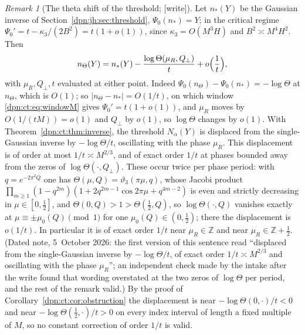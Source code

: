 \documentclass[11pt]{article}
\numberwithin{equation}{section}
\theoremstyle{definition}\newtheorem{definition}[theorem]{Definition}
\theoremstyle{remark}\newtheorem{remark}[theorem]{Remark}
\newcommand{\wrt}{\textup{[write]}}
\begin{document}
\begin{remark}[The theta shift of the threshold; \wrt]\label{dpn:ct:rem:shift}
Let $n_*(Y)$ be the Gaussian inverse of Section~\ref{dpn:jh:sec:threshold},
$\Psi_0(n_*)=Y$; in the critical regime $\Psi_0'=t-\kappa_3/(2B^2)=t(1+o(1))$,
since $\kappa_3=O(M^3H)$ and $B^2\asymp M^4H^2$.  Then
\begin{equation}\label{dpn:ct:eq:shift}
 n_\Theta(Y)=n_*(Y)-\frac{\log\Theta(\mu_R,Q_\perp)}{t}+o\Bigl(\frac1t\Bigr),
\end{equation}
with $\mu_R,Q_\perp,t$ evaluated at either point.  Indeed
$\Psi_0(n_\Theta)-\Psi_0(n_*)=-\log\Theta$ at $n_\Theta$, which is $O(1)$; so
$|n_\Theta-n_*|=O(1/t)$, on which window \eqref{dpn:ct:eq:windowM} gives
$\Psi_0'=t(1+o(1))$, and $\mu_R$ moves by $O(1/(tM))=o(1)$ and $Q_\perp$ by
$o(1)$, so $\log\Theta$ changes by $o(1)$.  With
Theorem~\ref{dpn:ct:thm:inverse}, the threshold $N_\alpha(Y)$ is displaced from
the single-Gaussian inverse by $-\log\Theta/t$, oscillating with the phase
$\mu_R$.  This displacement is of order at most $1/t\asymp M^{2/3}$, and of
exact order $1/t$ at phases bounded away from the zeros of
$\log\Theta(\cdot,Q_\perp)$.  These occur twice per phase period: with
$q=e^{-2\pi^2Q}$ one has $\Theta(\mu,Q)=\vartheta_3(\pi\mu,q)$, whose Jacobi
product $\prod_{m\ge1}(1-q^{2m})(1+2q^{2m-1}\cos2\pi\mu+q^{4m-2})$ is even
and strictly decreasing in $\mu\in[0,\frac12]$, and
$\Theta(0,Q)>1>\Theta(\frac12,Q)$, so $\log\Theta(\cdot,Q)$ vanishes exactly
at $\mu\equiv\pm\mu_0(Q)\pmod1$ for one $\mu_0(Q)\in(0,\frac12)$; there the
displacement is $o(1/t)$.  In particular it is of exact order $1/t$ near
$\mu_R\in\mathbb Z$ and near $\mu_R\in\mathbb Z+\frac12$.  (Dated note,
5~October 2026: the first version of this sentence read ``displaced from the
single-Gaussian inverse by $-\log\Theta/t$, of exact order $1/t\asymp M^{2/3}$
and oscillating with the phase $\mu_R$''; an independent check made by the
intake after the write found that wording overstated at the two zeros of
$\log\Theta$ per period, and the rest of the remark valid.)  By the proof of
Corollary~\ref{dpn:ct:cor:obstruction} the displacement is near
$-\log\Theta(0,\cdot)/t<0$ and near $-\log\Theta(\frac12,\cdot)/t>0$ on every
index interval of length a fixed multiple of $M$, so no constant correction of
order $1/t$ is valid.
\end{remark}
\end{document}
